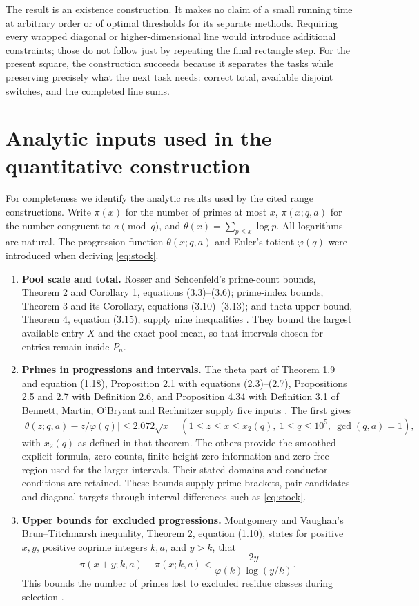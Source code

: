 \documentclass[11pt]{article}
\theoremstyle{definition}
\begin{document}
The result is an existence construction. It makes no claim of a small running
time at arbitrary order or of optimal thresholds for its separate methods.
Requiring every wrapped diagonal or higher-dimensional line would introduce
additional constraints; those do not follow just by repeating the final
rectangle step. For the present square, the construction succeeds because
it separates the tasks while preserving precisely what the next task needs:
correct total, available disjoint switches, and the completed line sums.

\appendix
\section{Analytic inputs used in the quantitative construction}\label{app:inputs}

For completeness we identify the analytic results used by the cited range
constructions. Write \(\pi(x)\) for the number of primes at most \(x\),
\(\pi(x;q,a)\) for the number congruent to \(a\pmod q\), and
\(\theta(x)=\sum_{p\le x}\log p\). All logarithms are natural. The
progression function \(\theta(x;q,a)\) and Euler's totient \(\varphi(q)\)
were introduced when deriving \eqref{eq:stock}.

\begin{enumerate}
\item \textbf{Pool scale and total.} Rosser and Schoenfeld's prime-count bounds,
Theorem 2 and Corollary 1, equations (3.3)--(3.6); prime-index bounds,
Theorem 3 and its Corollary, equations (3.10)--(3.13); and theta upper bound,
Theorem 4, equation (3.15), supply nine inequalities \cite{RS62}.
They bound the largest available entry \(X\) and the exact-pool mean, so that
intervals chosen for entries remain inside \(P_n\).
\item \textbf{Primes in progressions and intervals.} The theta part of
Theorem 1.9 and equation (1.18), Proposition 2.1 with equations (2.3)--(2.7),
Propositions 2.5 and 2.7 with Definition 2.6, and Proposition 4.34 with
Definition 3.1 of Bennett, Martin, O'Bryant and Rechnitzer supply five inputs
\cite{BMOR18}. The first gives
\[
 |\theta(z;q,a)-z/\varphi(q)|\le2.072\sqrt{x}
 \quad(1\le z\le x\le x_2(q),\ 1\le q\le10^5,\ \gcd(q,a)=1),
\]
with \(x_2(q)\) as defined in that theorem. The others provide the smoothed
explicit formula, zero counts, finite-height zero information and zero-free
region used for the larger intervals. Their stated domains and conductor
conditions are retained. These bounds supply prime brackets, pair candidates
and diagonal targets through interval differences such as \eqref{eq:stock}.
\item \textbf{Upper bounds for excluded progressions.} Montgomery and Vaughan's
Brun--Titchmarsh inequality, Theorem 2, equation (1.10), states for positive
\(x,y\), positive coprime integers \(k,a\), and \(y>k\), that
\[
 \pi(x+y;k,a)-\pi(x;k,a)
 <\frac{2y}{\varphi(k)\log(y/k)}.
\]
This bounds the number of primes lost to excluded residue classes during
selection \cite{MV73}.
\end{enumerate}
\end{document}
